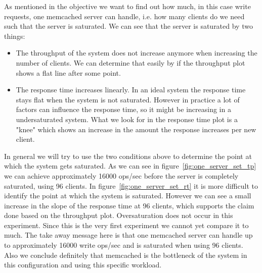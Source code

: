 \documentclass[11pt,a4paper]{article}
\begin{document}
%
As mentioned in the objective we want to find out how much, in this case write requests, one memcached server can handle, i.e. how many clients do we need such that the server is saturated.
%
We can see that the server is saturated by two things:
%
\begin{itemize}
	\item The throughput of the system does not increase anymore when increasing the number of clients. We can determine that easily by if the throughput plot shows a flat line after some point.
	\item The response time increases linearly. In an ideal system the response time stays flat when the system is not saturated. However in practice a lot of factors can influence the response time, so it might be increasing in a undersaturated system. What we look for in the response time plot is a "knee" which shows an increase in the amount the response increases per new client. 
\end{itemize}
%
In general we will try to use the two conditions above to determine the point at which the system gets saturated.
%
%
As we can see in figure~\ref{fig:one_server_set_tp} we can achieve approximately 16000 ops/sec before the server is completely saturated, using 96 clients.
%
In figure~\ref{fig:one_server_set_rt} it is more difficult to identify the point at which the system is saturated. 
%
However we can see a small increase in the slope of the response time at 96 clients, which supports the claim done based on the throughput plot.
%
Oversaturation does not occur in this experiment.
%
Since this is the very first experiment we cannot yet compare it to much.
%
The take away message here is that one memcached server can handle up to approximately 16000 write ops/sec and is saturated when using 96 clients.
%
Also we conclude definitely that memcached is the bottleneck of the system in this configuration and using this specific workload.
%
\end{document}
